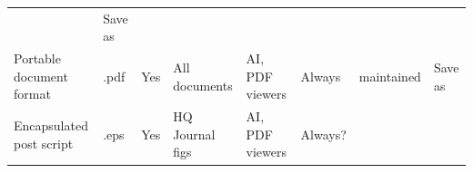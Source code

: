 \documentclass[]{article}
\begin{document}
\begin{longtable}[]{@{}llllllll@{}}
\begin{minipage}[t]{0.11\columnwidth}
\end{minipage} & \begin{minipage}[t]{0.09\columnwidth}\raggedright\strut
Save as\strut
\end{minipage}\tabularnewline
\begin{minipage}[t]{0.16\columnwidth}\raggedright\strut
Portable document format\strut
\end{minipage} & \begin{minipage}[t]{0.06\columnwidth}\raggedright\strut
.pdf\strut
\end{minipage} & \begin{minipage}[t]{0.07\columnwidth}\raggedright\strut
Yes\strut
\end{minipage} & \begin{minipage}[t]{0.10\columnwidth}\raggedright\strut
All documents\strut
\end{minipage} & \begin{minipage}[t]{0.10\columnwidth}\raggedright\strut
AI, PDF viewers\strut
\end{minipage} & \begin{minipage}[t]{0.10\columnwidth}\raggedright\strut
Always\strut
\end{minipage} & \begin{minipage}[t]{0.11\columnwidth}\raggedright\strut
maintained\strut
\end{minipage} & \begin{minipage}[t]{0.09\columnwidth}\raggedright\strut
Save as\strut
\end{minipage}\tabularnewline
\begin{minipage}[t]{0.16\columnwidth}\raggedright\strut
Encapsulated post script\strut
\end{minipage} & \begin{minipage}[t]{0.06\columnwidth}\raggedright\strut
.eps\strut
\end{minipage} & \begin{minipage}[t]{0.07\columnwidth}\raggedright\strut
Yes\strut
\end{minipage} & \begin{minipage}[t]{0.10\columnwidth}\raggedright\strut
HQ Journal figs\strut
\end{minipage} & \begin{minipage}[t]{0.10\columnwidth}\raggedright\strut
AI, PDF viewers\strut
\end{minipage} & \begin{minipage}[t]{0.10\columnwidth}\raggedright\strut
Always?\strut
\end{minipage} & \begin{minipage}[t]{0.11\columnwidth}\raggedright\strut

\end{minipage}
\end{longtable}
\end{document}
